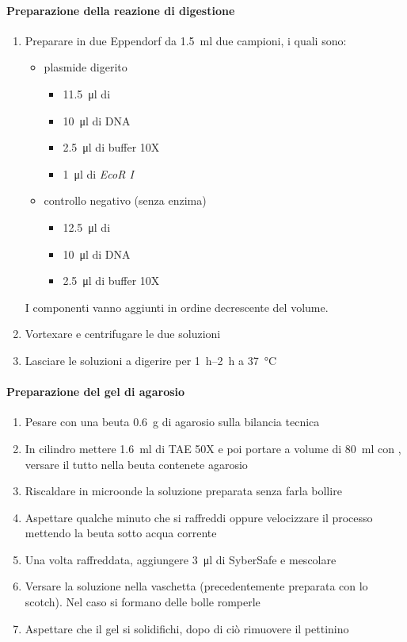 \paragraph{Preparazione della reazione di digestione}
\begin{enumerate}
	\item Preparare in due \foreignlanguage{german}{Eppendorf} da \qty{1.5}{\ml} due campioni, i quali sono:
	\begin{itemize}
		\item plasmide digerito
		\begin{itemize}
			\item \qty{11.5}{\micro\litre} di 
			\item \qty{10}{\micro\litre} di DNA
			\item \qty{2.5}{\micro\litre} di buffer 10X
			\item \qty{1}{\micro\litre} di \emph{EcoR I}
		\end{itemize}
		\item controllo negativo (senza enzima)
		\begin{itemize}
			\item \qty{12.5}{\micro\litre} di 
			\item \qty{10}{\micro\litre} di DNA
			\item \qty{2.5}{\micro\litre} di buffer 10X
		\end{itemize}
	\end{itemize}
	I componenti vanno aggiunti in ordine decrescente del volume.
	\item Vortexare e centrifugare le due soluzioni
	\item Lasciare le soluzioni a digerire per \qtyrange{1}{2}{\hour} a \qty{37}{\celsius}
\end{enumerate}
\paragraph{Preparazione del gel di agarosio}
\begin{enumerate}
	\item Pesare con una beuta \qty{0.6}{\g} di agarosio sulla bilancia tecnica 
	\item In cilindro mettere \qty{1.6}{\ml} di TAE 50X e poi portare a volume di \qty{80}{\ml} con , versare il tutto nella beuta contenete agarosio
	\item Riscaldare in microonde la soluzione preparata senza farla bollire
	\item Aspettare qualche minuto che si raffreddi oppure velocizzare il processo mettendo la beuta sotto acqua corrente
	\item Una volta raffreddata, aggiungere \qty{3}{\micro\litre} di SyberSafe e mescolare
	\item Versare la soluzione nella vaschetta (precedentemente preparata con lo scotch). Nel caso si formano delle bolle romperle
	\item Aspettare che il gel si solidifichi, dopo di ciò rimuovere il pettinino
\end{enumerate}

